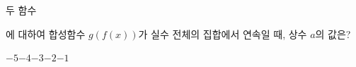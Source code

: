 두 함수 \par\smallskip{}\par\smallskip\noindent 에 대하여 합성함수 $g(f(x))$가 실수 전체의 집합에서 연속일 때, 상수 $a$의 값은?
\begin{choices32}{$-5$}{$-4$}{$-3$}{$-2$}{$-1$}\end{choices32}
